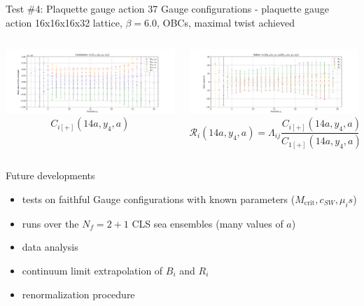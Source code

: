 \documentclass{beamer}
\begin{document}
\begin{frame}{Test \#4: Plaquette gauge action}
      37 Gauge configurations - plaquette gauge action\newline
      16x16x16x32 lattice, $\beta = 6.0$, OBCs, maximal twist achieved
      \begin{columns}
            \begin{column}{.5\textwidth}
                  \includegraphics[width=\textwidth]{../thesis-tex/imgs-MSc-thesis/plaq-3pts.pdf}
                  $$C_{i[+]}(14a,y_4,a)$$
            \end{column}
            \begin{column}{.5\textwidth}
                  \includegraphics[width=\textwidth]{../thesis-tex/imgs-MSc-thesis/ratios.pdf}
                  $$\mathcal{R}_i (14a,y_4,a) = \Lambda_{ij}\frac{C_{i[+]}(14a,y_4,a)}{C_{1[+]}(14a,y_4,a)}$$
            \end{column}
      \end{columns}
\end{frame}

\begin{frame}{Future developments}
      \begin{itemize}
            \item tests on faithful Gauge configurations with known parameters ($M_\text{crit}, c_{SW}, \mu_is$)
            \item runs over the $N_f = 2+1$ CLS sea ensembles (many values of $a$)
            \item data analysis 
            \item continuum limit extrapolation of $B_i$ and $R_i$
            \item renormalization procedure
      \end{itemize}
\end{frame}
\end{document}
